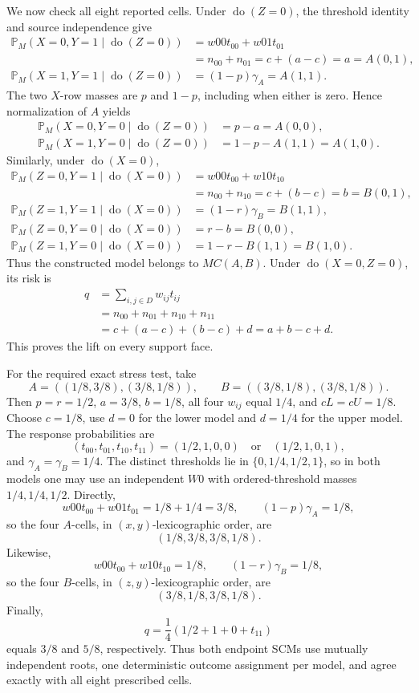 We now check all eight reported cells.  Under \(\operatorname{do}(Z=0)\), the threshold identity and source independence give
\[
\begin{aligned}
\mathbb P_M(X=0,Y=1\mid\operatorname{do}(Z=0))
&=w00t_{00}+w01t_{01}\\
&=n_{00}+n_{01}=c+(a-c)=a=A(0,1),\\
\mathbb P_M(X=1,Y=1\mid\operatorname{do}(Z=0))
&=(1-p)\gamma_A=A(1,1).
\end{aligned}
\]
The two \(X\)-row masses are \(p\) and \(1-p\), including when either is zero.  Hence normalization of \(A\) yields
\[
\begin{aligned}
\mathbb P_M(X=0,Y=0\mid\operatorname{do}(Z=0))
&=p-a=A(0,0),\\
\mathbb P_M(X=1,Y=0\mid\operatorname{do}(Z=0))
&=1-p-A(1,1)=A(1,0).
\end{aligned}
\]
Similarly, under \(\operatorname{do}(X=0)\),
\[
\begin{aligned}
\mathbb P_M(Z=0,Y=1\mid\operatorname{do}(X=0))
&=w00t_{00}+w10t_{10}\\
&=n_{00}+n_{10}=c+(b-c)=b=B(0,1),\\
\mathbb P_M(Z=1,Y=1\mid\operatorname{do}(X=0))
&=(1-r)\gamma_B=B(1,1),\\
\mathbb P_M(Z=0,Y=0\mid\operatorname{do}(X=0))
&=r-b=B(0,0),\\
\mathbb P_M(Z=1,Y=0\mid\operatorname{do}(X=0))
&=1-r-B(1,1)=B(1,0).
\end{aligned}
\]
Thus the constructed model belongs to \(MC(A,B)\).  Under \(\operatorname{do}(X=0,Z=0)\), its risk is
\[
\begin{aligned}
q
&=\sum_{i,j\in D}w_{ij}t_{ij}\\
&=n_{00}+n_{01}+n_{10}+n_{11}\\
&=c+(a-c)+(b-c)+d=a+b-c+d.
\end{aligned}
\]
This proves the lift on every support face.

For the required exact stress test, take
\[
A=((1/8,3/8),(3/8,1/8)),
\qquad
B=((3/8,1/8),(3/8,1/8)).
\]
Then \(p=r=1/2\), \(a=3/8\), \(b=1/8\), all four \(w_{ij}\) equal \(1/4\), and \(cL=cU=1/8\).  Choose \(c=1/8\), use \(d=0\) for the lower model and \(d=1/4\) for the upper model.  The response probabilities are
\[
(t_{00},t_{01},t_{10},t_{11})=(1/2,1,0,0)
\quad\text{or}\quad
(1/2,1,0,1),
\]
and \(\gamma_A=\gamma_B=1/4\).  The distinct thresholds lie in \(\{0,1/4,1/2,1\}\), so in both models one may use an independent \(W0\) with ordered-threshold masses \(1/4,1/4,1/2\).  Directly,
\[
w00t_{00}+w01t_{01}=1/8+1/4=3/8,
\qquad
(1-p)\gamma_A=1/8,
\]
so the four \(A\)-cells, in \((x,y)\)-lexicographic order, are
\[
(1/8,3/8,3/8,1/8).
\]
Likewise,
\[
w00t_{00}+w10t_{10}=1/8,
\qquad
(1-r)\gamma_B=1/8,
\]
so the four \(B\)-cells, in \((z,y)\)-lexicographic order, are
\[
(3/8,1/8,3/8,1/8).
\]
Finally,
\[
q=\frac14(1/2+1+0+t_{11})
\]
equals \(3/8\) and \(5/8\), respectively.  Thus both endpoint SCMs use mutually independent roots, one deterministic outcome assignment per model, and agree exactly with all eight prescribed cells.

